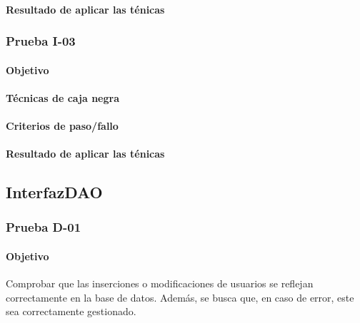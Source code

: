 \documentclass[10pt,a4paper]{article}
\begin{document}
			\paragraph{Resultado de aplicar las ténicas}
			\subsubsection{Prueba I-03}
			\paragraph{Objetivo}
			\paragraph{Técnicas de caja negra}
			\paragraph{Criterios de paso/fallo}
			\paragraph{Resultado de aplicar las ténicas}
	\subsection{InterfazDAO}
			\subsubsection{Prueba D-01}
			\paragraph{Objetivo} Comprobar que las inserciones o modificaciones de usuarios se reflejan correctamente en la base de datos.
			Además, se busca que, en caso de error, este sea correctamente gestionado.
\end{document}

